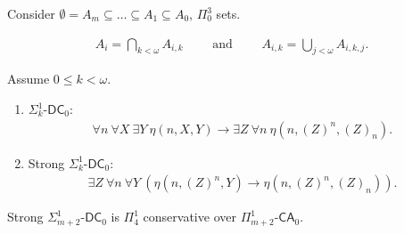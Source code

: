 \documentclass{beamer} %
\begin{document}

\begin{frame}
    Consider $\emptyset = A_m \subseteq \dots \subseteq A_1 \subseteq A_0$, $\Pi_0^3$ sets.

    \begin{align*}
        A_i = \bigcap_{k < \omega} A_{i,k} \qquad \text{ and } \qquad A_{i,k} = \bigcup_{j < \omega} A_{i, k, j}.
    \end{align*}
\end{frame}

\begin{frame}
    \begin{definition}
        Assume $0 \leq k < \omega$.
        \begin{enumerate}
            \item<2-> $\Sigma^1_k$-$\mathsf{DC}_0$: \begin{align*}
                \forall n \ \forall X \ \exists Y \ \eta(n, X, Y) \rightarrow \exists Z \ \forall n \ \eta(n, {(Z)}^n, {(Z)}_n). 
            \end{align*}
            \item<3-> Strong $\Sigma^1_k$-$\mathsf{DC}_0$: \begin{align*}
                \exists Z \ \forall n \ \forall Y \ (\eta(n, {(Z)}^n, Y) \rightarrow \eta(n, {(Z)}^n, {(Z)}_n)).
            \end{align*}
        \end{enumerate}
    \end{definition}
    \pause
    \pause
    \pause
    Strong $\Sigma^1_{m+2}$-$\mathsf{DC}_0$ is $\Pi^1_4$ conservative over $\Pi^1_{m+2}$-$\mathsf{CA}_0$.
\end{frame}

\end{document}
